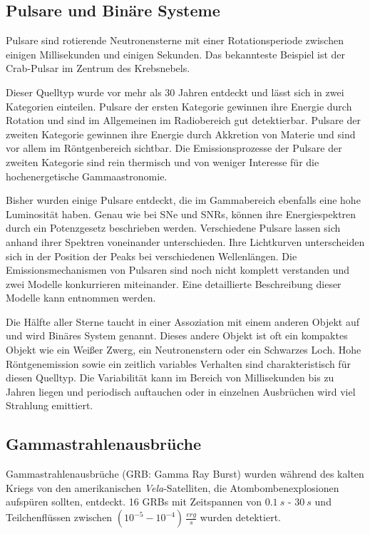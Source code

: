 \subsection{Pulsare und Binäre Systeme}
Pulsare sind rotierende Neutronensterne mit einer Rotationsperiode zwischen einigen Millisekunden und einigen Sekunden.
Das bekannteste Beispiel ist der Crab-Pulsar im Zentrum des Krebsnebels.

Dieser Quelltyp wurde vor mehr als 30 Jahren entdeckt und lässt sich in zwei Kategorien einteilen.
Pulsare der ersten Kategorie gewinnen ihre Energie durch Rotation und sind im Allgemeinen im Radiobereich gut detektierbar.
Pulsare der zweiten Kategorie gewinnen ihre Energie durch Akkretion von Materie und sind vor allem im Röntgenbereich sichtbar.
Die Emissionsprozesse der Pulsare der zweiten Kategorie sind rein thermisch und von weniger Interesse für die hochenergetische Gammaastronomie.

Bisher wurden einige Pulsare entdeckt, die im Gammabereich ebenfalls eine hohe Luminosität haben.
Genau wie bei SNe und SNRs, können ihre Energiespektren durch ein Potenzgesetz beschrieben werden.
Verschiedene Pulsare lassen sich anhand ihrer Spektren voneinander unterschieden.
Ihre Lichtkurven unterscheiden sich in der Position der Peaks bei verschiedenen Wellenlängen.
Die Emissionsmechanismen von Pulsaren sind noch nicht komplett verstanden und zwei Modelle konkurrieren miteinander.
Eine detaillierte Beschreibung dieser Modelle kann \cite{Weekes} entnommen werden.

Die Hälfte aller Sterne taucht in einer Assoziation mit einem anderen Objekt auf und wird Binäres System genannt.
Dieses andere Objekt ist oft ein kompaktes Objekt wie ein Weißer Zwerg, ein Neutronenstern oder ein Schwarzes Loch.
Hohe Röntgenemission sowie ein zeitlich variables Verhalten sind charakteristisch für diesen Quelltyp.
Die Variabilität kann im Bereich von Millisekunden bis zu Jahren liegen und periodisch auftauchen oder in einzelnen Ausbrüchen wird viel Strahlung emittiert.\cite{Weekes}


\subsection{Gammastrahlenausbrüche}
Gammastrahlenausbrüche (GRB: Gamma Ray Burst) wurden während des kalten Kriegs von den amerikanischen \textit{Vela}-Satelliten, die Atombombenexplosionen aufspüren sollten, entdeckt.
16 GRBs mit Zeitspannen von $\SI{0,1}{s}$ - $\SI{30}{s}$ und Teilchenflüssen zwischen $(10^{-5}-10^{-4})\,\frac{\si{erg}}{\si{s}}$ wurden detektiert.

